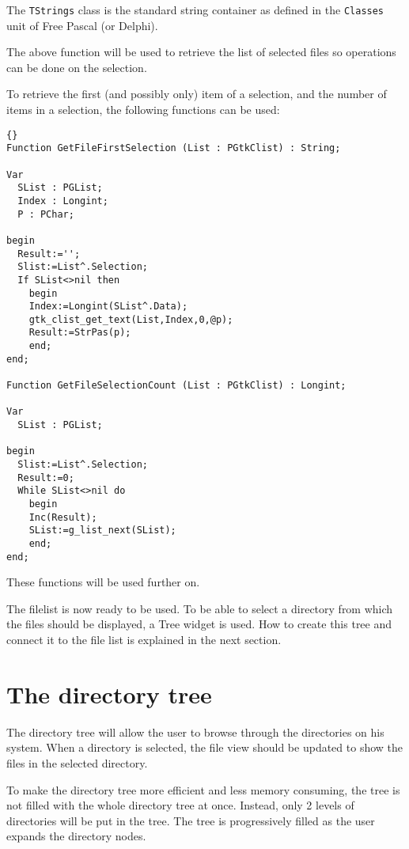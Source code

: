 \documentclass[10pt]{article}
\begin{document}
The \lstinline|TStrings| class is the standard string container as defined
in the \lstinline|Classes| unit of Free Pascal (or Delphi).

The above function will be used to retrieve the list of selected files so
operations can be done on the selection.

To retrieve the first (and possibly only) item of a selection, and the
number of items in a selection, the following functions can be used:
\begin{lstlisting}{}
Function GetFileFirstSelection (List : PGtkClist) : String;

Var
  SList : PGList;
  Index : Longint;
  P : PChar;
  
begin
  Result:='';
  Slist:=List^.Selection;
  If SList<>nil then
    begin
    Index:=Longint(SList^.Data);
    gtk_clist_get_text(List,Index,0,@p);
    Result:=StrPas(p);
    end;
end;

Function GetFileSelectionCount (List : PGtkClist) : Longint;

Var
  SList : PGList;
  
begin
  Slist:=List^.Selection;
  Result:=0;
  While SList<>nil do
    begin
    Inc(Result);
    SList:=g_list_next(SList);
    end;
end;
\end{lstlisting}
These functions will be used further on.

The filelist is now ready to be used. To be able to select a directory from
which the files should be displayed, a Tree widget is used. How to create
this tree and connect it to the file list is explained in the next section.

\section{The directory tree}
The directory tree will allow the user to browse through the directories on
his system. When a directory is selected, the file view should be updated 
to show the files in the selected directory.

To make the directory tree more efficient and less memory consuming, the
tree is not filled with the whole directory tree at once. Instead, only 2
levels of directories will be put in the tree. The tree is progressively
filled as the user expands the directory nodes. 
\end{document}
